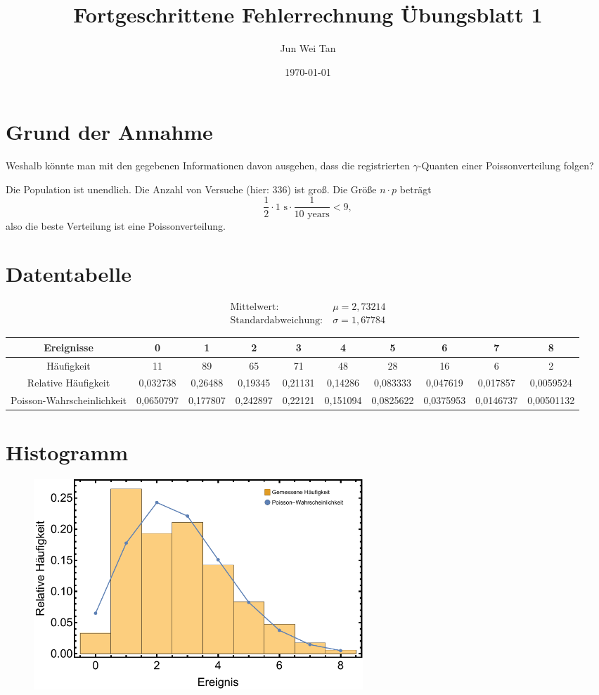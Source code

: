 \documentclass[prb,12pt]{revtex4-2}
\theoremstyle{definition}
\theoremstyle{definition}
\begin{document}
\title{Fortgeschrittene Fehlerrechnung Übungsblatt 1}
	\author{Jun Wei Tan}
	\date{\today}
	\maketitle

\section{Grund der Annahme}
\begin{tcolorbox}
	Weshalb könnte man mit den gegebenen Informationen davon ausgehen, dass die registrierten $\gamma$-Quanten einer Poissonverteilung folgen?
\end{tcolorbox}
Die Population ist unendlich. Die Anzahl von Versuche (hier: 336) ist groß. Die Größe $n\cdot p$ beträgt
\[\frac 12 \cdot 1\text{ s}\cdot \frac{1}{10\text{ years}}<9,\]
also die beste Verteilung ist eine Poissonverteilung.
\section{Datentabelle}
\begin{align*}
	\text{Mittelwert}:&~\mu=2,73214\\
	\text{Standardabweichung}:&~\sigma=1,67784
\end{align*}
\begin{table}[h]
	{\scriptsize
\begin{tabular}{cccccccccc}
	\toprule
	\textbf{Ereignisse} & 0 & 1 & 2 & 3 & 4 & 5 & 6 & 7 & 8 \\\midrule
	H\"{a}ufigkeit & 11 & 89 & 65 & 71 & 48 & 28 & 16 & 6 & 2 \\\midrule
	Relative H\"{a}ufigkeit & 0,032738 & 0,26488 & 0,19345 & 0,21131 & 0,14286 & 0,083333 & 0,047619 & 0,017857 & 0,0059524 \\\midrule
	Poisson-Wahrscheinlichkeit & 0,0650797 & 0,177807 & 0,242897 & 0,22121 & 0,151094 & 0,0825622 & 0,0375953 & 0,0146737 & 0,00501132 \\\bottomrule
\end{tabular}
}
\end{table}

\section{Histogramm}
\begin{figure}[h]
	\includegraphics[width=0.6\textwidth]{fig1.pdf}
	\caption{}
\end{figure}
\end{document}
